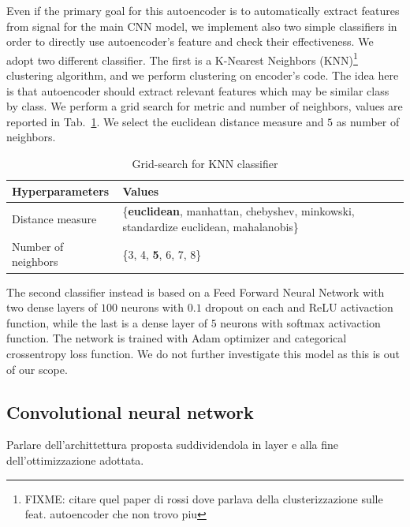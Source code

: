 Even if the primary goal for this autoencoder is to automatically
extract features from signal for the main CNN model, we implement also
two simple classifiers in order to directly use autoencoder's feature
and check their effectiveness. We adopt two different classifier.  The
first is a K-Nearest Neighbors (KNN)\footnote{FIXME: citare quel paper
  di rossi dove parlava della clusterizzazione sulle feat. autoencoder
  che non trovo piu} clustering algorithm, and we perform clustering
on encoder's code. The idea here is that autoencoder should extract
relevant features which may be similar class by class. We perform a
grid search for metric and number of neighbors, values are reported in
Tab.~\ref{tab:knn-grid-search}. We select the euclidean distance
measure and $5$ as number of neighbors.
\begin{table}
  \centering
  \begin{tabular}{p{2cm}p{4.5cm}}
    \hline
    Hyperparameters & Values \\
    \hline
    Distance measure & \{\textbf{euclidean}, manhattan, chebyshev, minkowski, standardize euclidean, mahalanobis\} \\
    Number of neighbors & \{3, 4, \textbf{5}, 6, 7, 8\} \\
    \hline
  \end{tabular}
  \caption{Grid-search for KNN classifier}
  \label{tab:knn-grid-search}
\end{table}
The second classifier instead is based on a Feed Forward Neural
Network with two dense layers of $100$ neurons with $0.1$ dropout on
each and ReLU activaction function, while the last is a dense layer of
$5$ neurons with softmax activaction function. The network is trained
with Adam optimizer and categorical crossentropy loss function. We do
not further investigate this model as this is out of our scope.

\subsection{Convolutional neural network}
\label{subsec:cnn}

Parlare dell'archittettura proposta suddividendola in layer e alla fine dell'ottimizzazione adottata.

